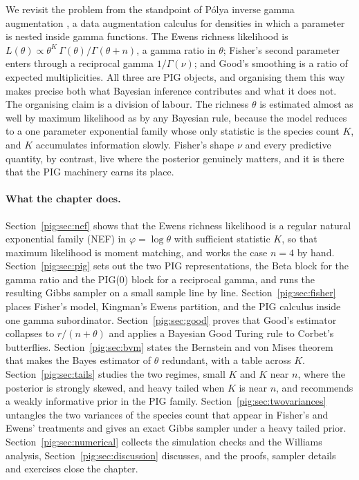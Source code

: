 We revisit the problem from the standpoint of P\'olya inverse gamma augmentation \citep{pig:he2022}, a data augmentation calculus for densities in which a parameter is nested inside gamma functions. The Ewens richness likelihood is $L(\theta)\propto\theta^K\,\Gamma(\theta)/\Gamma(\theta+n)$, a gamma ratio in $\theta$; Fisher's second parameter enters through a reciprocal gamma $1/\Gamma(\nu)$; and Good's smoothing is a ratio of expected multiplicities. All three are PIG objects, and organising them this way makes precise both what Bayesian inference contributes and what it does not. The organising claim is a division of labour. The richness $\theta$ is estimated almost as well by maximum likelihood as by any Bayesian rule, because the model reduces to a one parameter exponential family whose only statistic is the species count $K$, and $K$ accumulates information slowly. Fisher's shape $\nu$ and every predictive quantity, by contrast, live where the posterior genuinely matters, and it is there that the PIG machinery earns its place.

\paragraph{What the chapter does.} Section~\ref{pig:sec:nef} shows that the Ewens richness likelihood is a regular natural exponential family (NEF) in $\varphi=\log\theta$ with sufficient statistic $K$, so that maximum likelihood is moment matching, and works the case $n=4$ by hand. Section~\ref{pig:sec:pig} sets out the two PIG representations, the Beta block for the gamma ratio and the PIG(0) block for a reciprocal gamma, and runs the resulting Gibbs sampler on a small sample line by line. Section~\ref{pig:sec:fisher} places Fisher's model, Kingman's Ewens partition, and the PIG calculus inside one gamma subordinator. Section~\ref{pig:sec:good} proves that Good's estimator collapses to $r/(n+\theta)$ and applies a Bayesian Good Turing rule to Corbet's butterflies. Section~\ref{pig:sec:bvm} states the Bernstein and von Mises theorem that makes the Bayes estimator of $\theta$ redundant, with a table across $K$. Section~\ref{pig:sec:tails} studies the two regimes, small $K$ and $K$ near $n$, where the posterior is strongly skewed, and heavy tailed when $K$ is near $n$, and recommends a weakly informative prior in the PIG family. Section~\ref{pig:sec:twovariances} untangles the two variances of the species count that appear in Fisher's and Ewens' treatments and gives an exact Gibbs sampler under a heavy tailed prior. Section~\ref{pig:sec:numerical} collects the simulation checks and the Williams analysis, Section~\ref{pig:sec:discussion} discusses, and the proofs, sampler details and exercises close the chapter.

